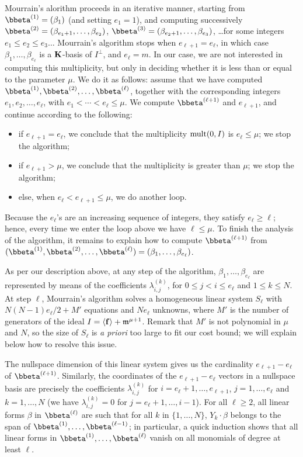 \documentclass[12pt]{article}
\begin{document}
Mourrain's alorithm proceeds in an iterative manner, starting from
$\bbeta^{(1)}=(\beta_{1})$ (and setting $e_1=1$), and computing
successively $\bbeta^{(2)}=(\beta_{e_1+1},\dots,\beta_{e_2})$,
$\bbeta^{(3)}=(\beta_{e_2+1},\dots,\beta_{e_3})$, \dots for some
integers $e_1 \le e_2 \le e_3 \dots$ Mourrain's algorithm stops when
$e_{\ell+1}=e_{\ell}$, in which case $\beta_1,\dots,\beta_{e_\ell}$ is
a $\mathbf{K}$-basis of $I^\perp$, and $e_\ell=m$. In our case, we
are not interested in computing this multiplicity, but only in
deciding whether it is less than or equal to the parameter $\mu$. We do it as follows: assume that we have
computed $\bbeta^{(1)},\bbeta^{(2)},\dots,\bbeta^{(\ell)}$, together
with the corresponding integers $e_1,e_2,\dots,e_\ell$, with $e_1 <
\cdots < e_\ell \le \mu$. We compute $\bbeta^{(\ell+1)}$ and $e_{\ell+1}$,
and continue according to the following:
\begin{itemize}
\item if $e_{\ell+1}=e_{\ell}$, we conclude that the multiplicity $\mathrm{mult}(0,I)$
  is $e_\ell \le \mu$; we stop the algorithm;
\item if $e_{\ell+1} > \mu$, we conclude that the multiplicity is greater 
  than $\mu$; we stop the algorithm;
\item else, when $e_\ell < e_{\ell+1} \le \mu$, we do another loop.
\end{itemize}
Because the $e_\ell$'s are an increasing sequence of integers, they
satisfy $e_\ell \ge \ell$; hence, every time we enter the loop above we
have $\ell \le \mu$. To finish the analysis of the algorithm, it
remains to explain how to compute $\bbeta^{(\ell+1)}$ from
$(\bbeta^{(1)},\bbeta^{(2)},\dots,\bbeta^{(\ell)})=(\beta_{1},\dots,\beta_{e_\ell})$.

As per our description above, at any step of the algorithm,
$\beta_{1},\dots,\beta_{e_\ell}$ are represented by means of the
coefficients $\lambda^{(k)}_{i,j}$, for $0 \le j < i \le e_{\ell}$ and
$1 \le k \le N$.  At step $\ell$, Mourrain's algorithm solves a homogeneous linear system
$S_\ell$ with $N(N-1) e_\ell/2+M'$ equations and $N e_\ell$ unknowns,
where $M'$ is the number of generators of the ideal $I= \langle \mathbf{f}
\rangle + \mathfrak{m}^{\mu+1}$. Remark that $M'$ is not polynomial in $\mu$ 
and $N$, so the size of $S_\ell$ is {\em a priori} too large to 
fit our cost bound; we will explain below how to resolve this issue.

The nullspace dimension of this linear system gives us the cardinality
$e_{\ell+1}-e_{\ell}$ of $\bbeta^{(\ell+1)}$. Similarly, the coordinates of
the $e_{\ell+1}-e_{\ell}$ vectors in a nullspace basis are precisely
the coefficients $\lambda^{(k)}_{i,j}$ for
$i=e_{\ell}+1,\dots,e_{\ell+1}$, $j=1,\dots,e_\ell$ and $k=1,\dots,N$
(we have $\lambda^{(k)}_{i,j}=0$ for $j=e_{\ell}+1,\dots,i-1$). For
all $\ell \ge 2$, all linear forms $\beta$ in $\bbeta^{(\ell)}$ are
such that for all $k$ in $\{1,\dots,N\}$, $Y_k \cdot \beta$ belongs to
the span of $\bbeta^{(1)},\dots,\bbeta^{(\ell-1)}$; in particular, a
quick induction shows that all linear forms in
$\bbeta^{(1)},\dots,\bbeta^{(\ell)}$ vanish on all monomials of degree
at least $\ell$.
\end{document}
